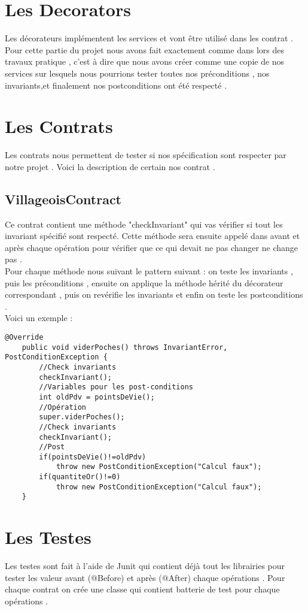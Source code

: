 \section{Les Decorators}
Les décorateurs implémentent les services et vont être utilisé dans les contrat . Pour cette partie du projet nous avons fait exactement comme dans lors des travaux pratique , c'est à dire que nous avons créer comme une copie de nos services sur lesquels nous pourrions tester toutes nos préconditions , nos invariants,et finalement nos postconditions ont été respecté .

\section{Les Contrats}
Les contrats nous permettent de tester si nos spécification sont respecter par notre projet .
Voici la description de certain nos contrat .
\subsection{VillageoisContract}
Ce contrat contient une méthode "checkInvariant"  qui vas vérifier si tout les invariant spécifié sont respecté. Cette méthode sera ensuite appelé dans avant et après chaque opération pour vérifier que ce qui devait ne pas changer ne change pas .\\
Pour chaque méthode nous suivant le pattern suivant : on teste les invariants , puis les préconditions , ensuite on applique la méthode hérité du décorateur correspondant , puis on revérifie les invariants et enfin on teste les postconditions .\\
Voici un exemple :
\begin{verbatim}
@Override
	public void viderPoches() throws InvariantError, PostConditionException {
		//Check invariants
		checkInvariant();
		//Variables pour les post-conditions
		int oldPdv = pointsDeVie();
		//Opération
		super.viderPoches();
		//Check invariants
		checkInvariant();
		//Post
		if(pointsDeVie()!=oldPdv)
			throw new PostConditionException("Calcul faux");
		if(quantiteOr()!=0)
			throw new PostConditionException("Calcul faux");
	}
\end{verbatim}



\section{Les Testes}
Les testes sont fait à l'aide de Junit qui contient déjà tout les librairies pour tester les valeur avant (@Before)  et après (@After) chaque opérations . Pour chaque contrat on crée une classe qui contient batterie de test pour chaque opérations .
